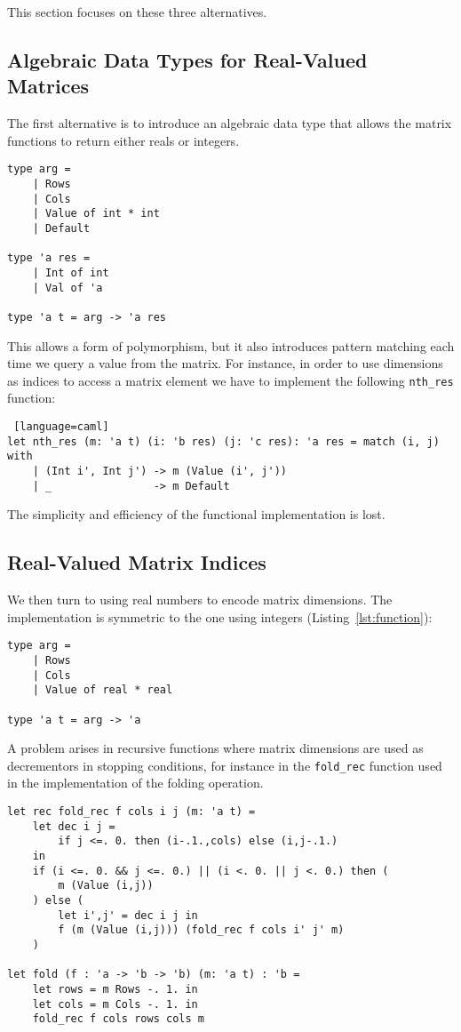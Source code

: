 \documentclass[runningheads]{llncs}
\begin{document}
This section focuses on these three alternatives.

\subsection{Algebraic Data Types for  Real-Valued Matrices}

The first alternative is to introduce an algebraic data type that allows the matrix functions to return either reals or integers. 

\begin{lstlisting}[language=caml]
type arg =
	| Rows
	| Cols
	| Value of int * int
	| Default

type 'a res = 
	| Int of int
	| Val of 'a

type 'a t = arg -> 'a res
\end{lstlisting}

This allows a form of polymorphism, but it also introduces pattern matching each time we query a value from the matrix. For instance, in order to use dimensions as indices to access a matrix element we have to implement the following \lstinline{nth_res} function:  

\begin{lstlisting} [language=caml]
let nth_res (m: 'a t) (i: 'b res) (j: 'c res): 'a res = match (i, j) with 
	| (Int i', Int j') -> m (Value (i', j'))
	| _                -> m Default
\end{lstlisting}

The simplicity and efficiency of the functional implementation is lost.

\subsection{Real-Valued Matrix Indices}

We then turn to using real numbers to encode matrix dimensions. The implementation is symmetric to the one using integers (Listing~\ref{lst:function}):

\begin{lstlisting}[language=caml]
type arg =
	| Rows
	| Cols
	| Value of real * real

type 'a t = arg -> 'a
\end{lstlisting}

\noindent A problem arises in recursive functions where matrix dimensions are used as decrementors in stopping conditions, for instance in the \lstinline{fold_rec} function used in the implementation of the folding operation.
\begin{lstlisting}[language=caml]
let rec fold_rec f cols i j (m: 'a t) =
	let dec i j =
		if j <=. 0. then (i-.1.,cols) else (i,j-.1.)
	in
	if (i <=. 0. && j <=. 0.) || (i <. 0. || j <. 0.) then (
		m (Value (i,j))
	) else (
		let i',j' = dec i j in
		f (m (Value (i,j))) (fold_rec f cols i' j' m)
	)

let fold (f : 'a -> 'b -> 'b) (m: 'a t) : 'b =
	let rows = m Rows -. 1. in
	let cols = m Cols -. 1. in
	fold_rec f cols rows cols m
\end{lstlisting}
\end{document}
